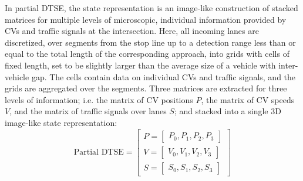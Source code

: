 \documentclass[journal]{IEEEtran}
\begin{document}
In partial DTSE, the state representation is an image-like construction of stacked matrices for multiple levels of microscopic, individual information provided by CVs and traffic signals at the intersection. Here, all incoming lanes are discretized, over segments from the stop line up to a detection range less than or equal to the total length of the corresponding approach, into grids with cells of fixed length, set to be slightly larger than the average size of a vehicle with inter-vehicle gap. The cells contain data on individual CVs and traffic signals, and the grids are aggregated over the segments. Three matrices are extracted for three levels of information; i.e. the matrix of CV positions $P$, the matrix of CV speeds $V$, and the matrix of traffic signals over lanes $S$; and stacked into a single 3D image-like state representation: 
\\ 
\[
\text{Partial DTSE} = 
    \begin{bmatrix}
      P = \begin{bmatrix}
      P_0, P_1, P_2, P_3
      \end{bmatrix} \\
      V = \begin{bmatrix}
      V_0, V_1, V_2, V_3
     \end{bmatrix} \\
     S = \begin{bmatrix}
      S_0, S_1, S_2, S_3
     \end{bmatrix}
\end{bmatrix} \]
\end{document}
